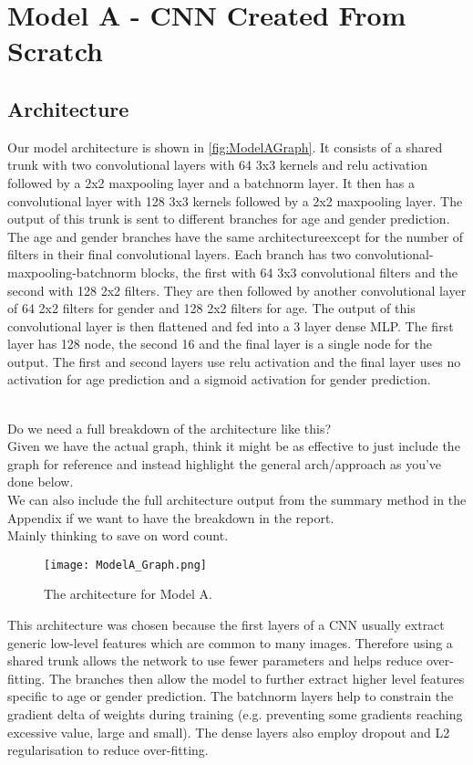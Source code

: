 
\section{Model A - CNN Created From Scratch}
\subsection{Architecture}
Our model architecture is shown in \autoref{fig:ModelAGraph}. 
It consists of a shared trunk with two convolutional layers with 64 3x3 kernels and relu activation followed by a 2x2 maxpooling layer and a batchnorm layer. 
It then has a convolutional layer with 128 3x3 kernels followed by a 2x2 maxpooling layer. 
The output of this trunk is sent to different branches for age and gender prediction. 
The age and gender branches have the same architectureexcept for the number of filters in their final convolutional layers. 
Each branch has two convolutional-maxpooling-batchnorm blocks, the first with 64 3x3 convolutional filters and the second with 128 2x2 filters. 
They are then followed by another convolutional layer of 64 2x2 filters for gender and 128 2x2 filters for age. 
The output of this convolutional layer is then flattened and fed into a 3 layer dense MLP. 
The first layer has 128 node, the second 16 and the final layer is a single node for the output. 
The first and second layers use relu activation and the final layer uses no activation for age prediction and a sigmoid activation for gender prediction.
\begin{notes}
    \\Do we need a full breakdown of the architecture like this?\\
    Given we have the actual graph, think it might be as effective to just include the graph for reference and instead highlight the general arch/approach as you've done below.\\
    We can also include the full architecture output from the summary method in the Appendix if we want to have the breakdown in the report.\\
    Mainly thinking to save on word count.
\end{notes}

\begin{figure}[h!]
    \centering
    \texttt{[image: ModelA\_Graph.png]}
    \caption{The architecture for Model A.}
    \label{fig:ModelAGraph}
\end{figure}

This architecture was chosen because the first layers of a CNN usually extract generic low-level features which are common to many images. 
Therefore using a shared trunk allows the network to use fewer parameters and helps reduce over-fitting.
The branches then allow the model to further extract higher level features specific to age or gender prediction. 
The batchnorm layers help to constrain the gradient delta of weights during training (e.g. preventing some gradients reaching excessive value, large and small). 
The dense layers also employ dropout and L2 regularisation to reduce over-fitting. 

